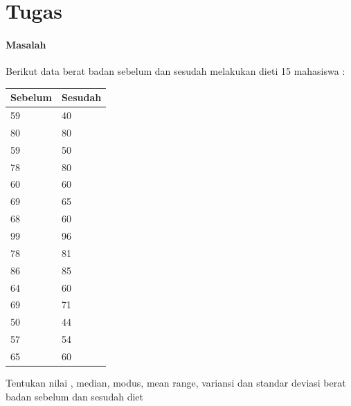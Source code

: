 \documentclass[a4paper,12pt]{article}
\begin{document}
\section{Tugas}
\paragraph{Masalah\\}
Berikut data berat badan sebelum dan sesudah melakukan dieti 15 mahasiswa :
\begin{table}[!ht]
	\begin{tabular}{|l|l|}
		\hline
		
		Sebelum & Sesudah \\ \hline
		59 & 40 \\ \hline
		80 & 80 \\ \hline
		59 & 50 \\ \hline
		78 & 80 \\ \hline
		60 & 60 \\ \hline
		69 & 65 \\ \hline
		68 & 60 \\ \hline
		99 & 96 \\ \hline
		78 & 81 \\ \hline
		86 & 85 \\ \hline
		64 & 60 \\ \hline
		69 & 71 \\ \hline
		50 & 44 \\ \hline
		57 & 54 \\ \hline
		65 & 60 \\ \hline
		
	\end{tabular}
\end{table}
Tentukan nilai , median, modus, mean range, variansi dan standar deviasi berat badan sebelum dan sesudah diet
\end{document}
